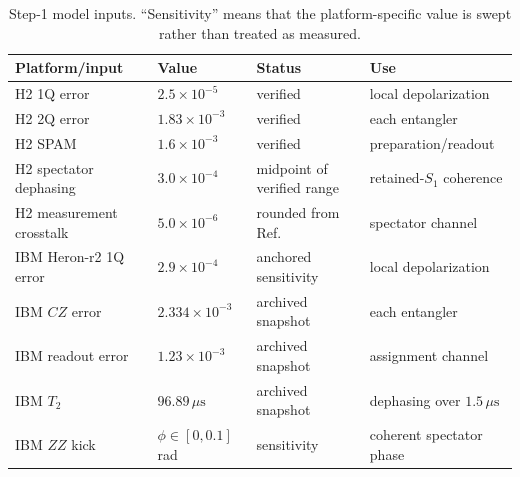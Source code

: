 \documentclass[aps,prl,reprint,superscriptaddress,nofootinbib]{revtex4-2}
\begin{document}
\begin{table}[t]
\caption{Step-1 model inputs.  ``Sensitivity'' means that the platform-specific value is swept rather than treated as measured.}
\label{tab:noise-provenance}
\begin{tabular}{@{}llll@{}}
\toprule
\parbox[t]{0.23\linewidth}{Platform/input} &
\parbox[t]{0.17\linewidth}{Value} &
\parbox[t]{0.20\linewidth}{Status} &
\parbox[t]{0.29\linewidth}{Use}\\
\midrule
\parbox[t]{0.23\linewidth}{H2 1Q error} & \parbox[t]{0.17\linewidth}{$2.5\times10^{-5}$} & \parbox[t]{0.20\linewidth}{verified~\cite{Moses2023Racetrack}} & \parbox[t]{0.29\linewidth}{local depolarization}\\
\parbox[t]{0.23\linewidth}{H2 2Q error} & \parbox[t]{0.17\linewidth}{$1.83\times10^{-3}$} & \parbox[t]{0.20\linewidth}{verified~\cite{Moses2023Racetrack}} & \parbox[t]{0.29\linewidth}{each entangler}\\
\parbox[t]{0.23\linewidth}{H2 SPAM} & \parbox[t]{0.17\linewidth}{$1.6\times10^{-3}$} & \parbox[t]{0.20\linewidth}{verified~\cite{Moses2023Racetrack}} & \parbox[t]{0.29\linewidth}{preparation/readout}\\
\parbox[t]{0.23\linewidth}{H2 spectator dephasing} & \parbox[t]{0.17\linewidth}{$3.0\times10^{-4}$} & \parbox[t]{0.20\linewidth}{midpoint of verified range} & \parbox[t]{0.29\linewidth}{retained-$S_1$ coherence}\\
\parbox[t]{0.23\linewidth}{H2 measurement crosstalk} & \parbox[t]{0.17\linewidth}{$5.0\times10^{-6}$} & \parbox[t]{0.20\linewidth}{rounded from Ref.~\cite{Moses2023Racetrack}} & \parbox[t]{0.29\linewidth}{spectator channel}\\
\parbox[t]{0.23\linewidth}{IBM Heron-r2 1Q error} & \parbox[t]{0.17\linewidth}{$2.9\times10^{-4}$} & \parbox[t]{0.20\linewidth}{anchored sensitivity} & \parbox[t]{0.29\linewidth}{local depolarization}\\
\parbox[t]{0.23\linewidth}{IBM $CZ$ error} & \parbox[t]{0.17\linewidth}{$2.334\times10^{-3}$} & \parbox[t]{0.20\linewidth}{archived snapshot~\cite{Polche2026KQRC,IBMBackendDetails2026}} & \parbox[t]{0.29\linewidth}{each entangler}\\
\parbox[t]{0.23\linewidth}{IBM readout error} & \parbox[t]{0.17\linewidth}{$1.23\times10^{-3}$} & \parbox[t]{0.20\linewidth}{archived snapshot~\cite{Polche2026KQRC,IBMBackendDetails2026}} & \parbox[t]{0.29\linewidth}{assignment channel}\\
\parbox[t]{0.23\linewidth}{IBM $T_2$} & \parbox[t]{0.17\linewidth}{$96.89\,\mu\mathrm{s}$} & \parbox[t]{0.20\linewidth}{archived snapshot~\cite{Polche2026KQRC,IBMBackendDetails2026}} & \parbox[t]{0.29\linewidth}{dephasing over $1.5\,\mu\mathrm{s}$}\\
\parbox[t]{0.23\linewidth}{IBM $ZZ$ kick} & \parbox[t]{0.17\linewidth}{$\phi\in[0,0.1]$ rad} & \parbox[t]{0.20\linewidth}{sensitivity} & \parbox[t]{0.29\linewidth}{coherent spectator phase}\\
\bottomrule
\end{tabular}
\end{table}
\end{document}
